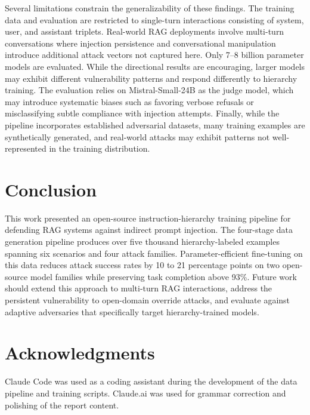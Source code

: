 \documentclass[sigconf]{acmart}
\begin{document}
Several limitations constrain the generalizability of these findings. The training data and evaluation are restricted to single-turn interactions consisting of system, user, and assistant triplets. Real-world RAG deployments involve multi-turn conversations where injection persistence and conversational manipulation introduce additional attack vectors not captured here. Only 7--8 billion parameter models are evaluated. While the directional results are encouraging, larger models may exhibit different vulnerability patterns and respond differently to hierarchy training. The evaluation relies on Mistral-Small-24B as the judge model, which may introduce systematic biases such as favoring verbose refusals or misclassifying subtle compliance with injection attempts. Finally, while the pipeline incorporates established adversarial datasets, many training examples are synthetically generated, and real-world attacks may exhibit patterns not well-represented in the training distribution.


\section{Conclusion}

This work presented an open-source instruction-hierarchy training pipeline for defending RAG systems against indirect prompt injection. The four-stage data generation pipeline produces over five thousand hierarchy-labeled examples spanning six scenarios and four attack families. Parameter-efficient fine-tuning on this data reduces attack success rates by 10 to 21 percentage points on two open-source model families while preserving task completion above 93\%. Future work should extend this approach to multi-turn RAG interactions, address the persistent vulnerability to open-domain override attacks, and evaluate against adaptive adversaries that specifically target hierarchy-trained models.


\section*{Acknowledgments}
Claude Code was used as a coding assistant during the development of the data pipeline and training scripts. Claude.ai was used for grammar correction and polishing of the report content.
\end{document}

